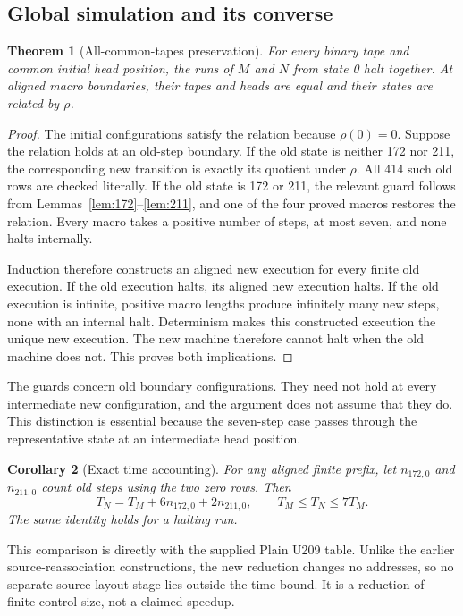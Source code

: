 \documentclass[11pt,letterpaper]{article}
\newtheorem{theorem}{Theorem}[section]
\newtheorem{corollary}[theorem]{Corollary}
\begin{document}
\subsection{Global simulation and its converse}
\begin{theorem}[All-common-tapes preservation]\label{thm:global}
For every binary tape and common initial head position, the runs of $M$ and
$N$ from state 0 halt together. At aligned macro boundaries, their tapes
and heads are equal and their states are related by $\rho$.
\end{theorem}
\begin{proof}
The initial configurations satisfy the relation because $\rho(0)=0$.
Suppose the relation holds at an old-step boundary. If the old state is
neither 172 nor 211, the corresponding new transition is exactly its
quotient under $\rho$. All 414 such old rows are checked literally.
If the old state is 172 or 211, the relevant guard follows from
Lemmas~\ref{lem:172}--\ref{lem:211}, and one of the four proved macros
restores the relation. Every macro takes a positive number of steps, at most
seven, and none halts internally.

Induction therefore constructs an aligned new execution for every finite
old execution. If the old execution halts, its aligned new execution halts.
If the old execution is infinite, positive macro lengths produce infinitely
many new steps, none with an internal halt. Determinism makes this constructed
execution the unique new execution. The new machine therefore cannot halt
when the old machine does not. This proves both implications.
\end{proof}

The guards concern old boundary configurations. They need not hold at every
intermediate new configuration, and the argument does not assume that they do.
This distinction is essential because the seven-step case passes through
the representative state at an intermediate head position.

\begin{corollary}[Exact time accounting]\label{cor:time}
For any aligned finite prefix, let $n_{172,0}$ and $n_{211,0}$ count old
steps using the two zero rows. Then
\[
 T_N=T_M+6n_{172,0}+2n_{211,0},
 \qquad T_M\le T_N\le7T_M.
\]
The same identity holds for a halting run.
\end{corollary}
This comparison is directly with the supplied Plain U209 table. Unlike the
earlier source-reassociation constructions, the new reduction changes no
addresses, so no separate source-layout stage lies outside the time bound.
It is a reduction of finite-control size, not a claimed speedup.
\end{document}
